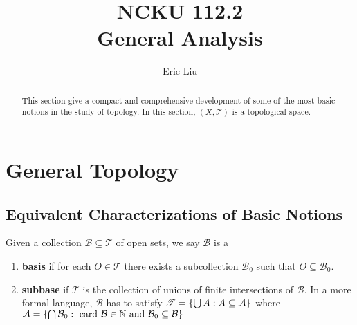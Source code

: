 \documentclass{report}
\title{\Huge{NCKU 112.2}\\
General Analysis}
\author{\huge{Eric Liu}}
\date{}
\begin{document}
\maketitle
\newpage%

\tableofcontents
\pagebreak

\chapter{General Topology}
\section{Equivalent Characterizations of Basic Notions}
\begin{abstract}
This section give a compact and comprehensive development of some of the most basic notions in the study of topology. In this section, $(X,\mathscr{T })$ is a topological space.
\end{abstract}
\begin{mdframed}
Given a collection $\mathcal{B}\subseteq \mathscr{T }$ of open sets, we say $\mathcal{B}$ is a  
\begin{enumerate}[label=(\alph*)]
  \item  \textbf{basis} if for each $O\in \mathscr{T }$ there exists a subcollection $\mathcal{B}_0$ such that $O\subseteq \mathcal{B}_0$.
  \item \textbf{subbase} if  $\mathscr{T }$ is the collection of unions of finite intersections of $\mathcal{B}$. In a more formal language, $\mathcal{B}$ has to satisfy $\mathscr{T }=\{ \bigcup A:A\subseteq \mathcal{A} \}$ where $\mathcal{A}=\{ \bigcap \mathcal{B}_0: \text{ card }\mathcal{B}\in\mathbb{N}\text{ and }\mathcal{B}_0 \subseteq \mathcal{B} \}$ 
\end{enumerate}
\end{mdframed}
\end{document}
